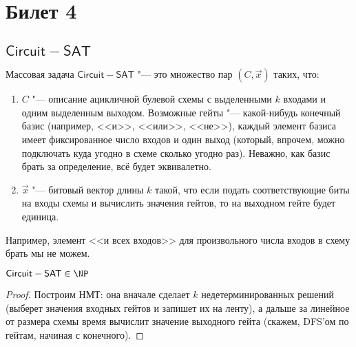 \section{Билет 4}
\subsection{$\mathsf{Circuit-SAT}$}
	\begin{Def}
		Массовая задача $\mathsf{Circuit-SAT}$ "--- это множество пар $(C, \vec x)$ таких, что:
		\begin{enumerate}
			\item $C$ "--- описание ацикличной булевой схемы с выделенными $k$ входами и одним выделенным выходом.
				Возможные гейты "--- какой-нибудь конечный базис (например, <<и>>, <<или>>, <<не>>), каждый элемент
				базиса имеет фиксированное число входов и один выход (который, впрочем, можно подключать куда угодно в схеме сколько угодно раз).
				Неважно, как базис брать за определение, всё будет эквивалетно.
			\item
				$\vec x$ "--- битовый вектор длины $k$ такой, что если подать соответствующие биты на входы схемы и вычислить значения гейтов,
				то на выходном гейте будет единица.
		\end{enumerate}
	\end{Def}
	\begin{Rem}
		Например, элемент <<и всех входов>> для произвольного числа входов в схему брать мы не можем.
	\end{Rem}

	\begin{lemma}
		$\mathsf{Circuit-SAT} \in \NP$
	\end{lemma}
	\begin{proof}
		Построим НМТ: она вначале сделает $k$ недетерминированных решений (выберет значения входных гейтов и запишет их на ленту), а дальше
		за линейное от размера схемы время вычислит значение выходного гейта (скажем, DFS'ом по гейтам, начиная с конечного).
	\end{proof}

